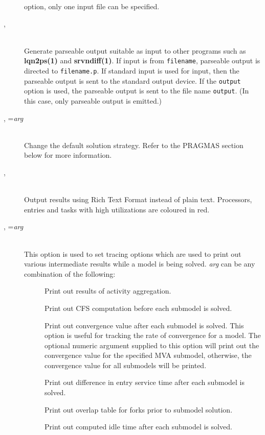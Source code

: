 \begin{description}
option, only one input file can be specified.
\item[\flag{p}{}, \longopt{parseable}]~\\
Generate parseable output suitable as input to other programs such as
\textbf{lqn2ps(1)} and \textbf{srvndiff(1)}.  If input is from
\texttt{filename}, parseable output is directed to \texttt{filename.p}.
If standard input is used for input, then the parseable output is sent
to the standard output device.  If the \texttt{output} option is used, the
parseable output is sent to the file name \texttt{output}.
(In this case, only parseable output is emitted.)
\item[\flag{P}{}, \longopt{pragma}=\emph{arg}]~\\
Change the default solution strategy.  Refer to the PRAGMAS section
below for more information.
\item[\flag{r}{}, \longopt{rtf}]~\\
Output results using Rich Text Format instead of plain text.  Processors, entries and tasks with high utilizations are coloured in red.
\item[\flag{t}{}, \longopt{trace}=\emph{arg}]~\\
This option is used to set tracing  options which are used to print out various
intermediate results  while a model is being solved.
\emph{arg} can be any combination of the following:
\begin{description}
\item[]
Print out results of activity aggregation.
\item[]
Print out CFS computation before each submodel is solved.
\item[]
Print out convergence value after each submodel is solved.
This option is useful for tracking the rate of convergence for a model.
The optional numeric argument supplied to this option will print out the convergence value for the specified MVA submodel, otherwise,
the convergence value for all submodels will be printed.
\item[]
Print out difference in entry service time after each submodel is solved.
\item[]
Print out overlap table for forks prior to submodel solution.
\item[]
Print out computed idle time after each submodel is solved.
\item[]

\end{description}
\end{description}
